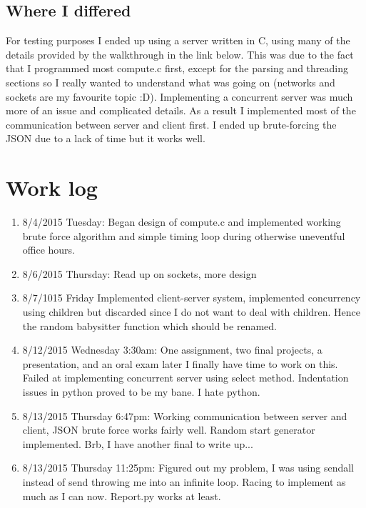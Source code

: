 \documentclass[letterpaper,10pt,titlepage]{article}
\begin{document}
\subsection{Where I differed}
For testing purposes I ended up using a server written in C, using many of the details provided by the walkthrough in the link below.
This was due to the fact that I programmed most compute.c first, except for the parsing and threading sections so I really wanted to understand
what was going on (networks and sockets are my favourite topic :D). 
Implementing a concurrent server was much more of an issue and complicated details. As a result I implemented most of the communication
between server and client first. I ended up brute-forcing the JSON due to a lack of time but it works well.




\section{Work log}


\begin{enumerate}
\item 8/4/2015 Tuesday:
	Began design of compute.c and implemented working brute force algorithm and simple timing loop during otherwise uneventful office hours.
\item 8/6/2015 Thursday:
	Read up on sockets, more design
\item 8/7/1015 Friday
	Implemented client-server system, implemented concurrency using children but discarded since I do not want to deal with children.
Hence the random babysitter function which should be renamed.
\item 8/12/2015 Wednesday 3:30am:
	One assignment, two final projects, a presentation, and an oral exam later I finally have time to work on this. 
Failed at implementing concurrent server using select method. Indentation issues in python proved to be my bane. I hate python.
\item 8/13/2015 Thursday 6:47pm:
	Working communication between server and client, JSON brute force works fairly well. Random start generator implemented.
Brb, I have another final to write up...
\item  8/13/2015 Thursday 11:25pm:
	Figured out my problem, I was using sendall instead of send throwing me into an infinite loop. Racing to implement as much
as I can now. Report.py works at least. 

\end{enumerate}
\end{document}
